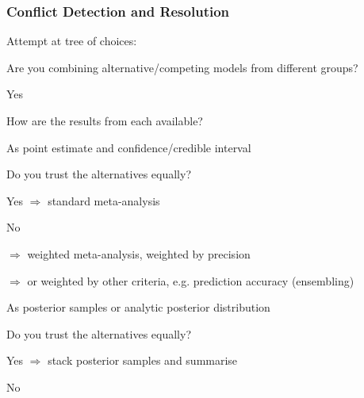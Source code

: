 \documentclass{article}
\begin{document}
\subsubsection{Conflict Detection and Resolution}

Attempt at tree of choices:
\begin{tree}
    \item Are you combining alternative/competing models from different groups?
    \begin{tree}
        \item Yes
        \begin{tree}
            \item How are the results from each available?
            \begin{tree}
                \item As point estimate and confidence/credible interval
                \begin{tree}
                    \item Do you trust the alternatives equally?
                    \begin{tree}
                        \item Yes $\Rightarrow$ standard meta-analysis
                        \item No
                        \begin{tree}
                            \item $\Rightarrow$ weighted meta-analysis, weighted by precision
                            \item $\Rightarrow$ or weighted by other criteria, e.g. prediction accuracy (ensembling)
                        \end{tree}
                    \end{tree}
                \end{tree}
                \item As posterior samples or analytic posterior distribution
                \begin{tree}
                    \item Do you trust the alternatives equally?
                    \begin{tree}
                        \item Yes $\Rightarrow$ stack posterior samples and summarise
                        \item No

\end{tree}
\end{tree}
\end{tree}
\end{tree}
\end{tree}
\end{tree}
\end{document}
